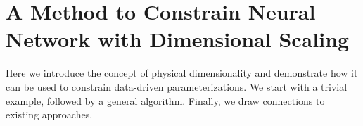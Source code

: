 \documentclass[draft]{agujournal2019}
\providecommand{\DIFdelend}{} %
\begin{document}

\DIFdelend \section{A Method to Constrain Neural Network with Dimensional Scaling} \label{sec:unit_invariance}

Here we introduce the concept of physical dimensionality and demonstrate how it can be used to constrain data-driven parameterizations. %
We start with a trivial example, followed by a general algorithm. Finally, we draw connections to existing approaches.


\end{document}
